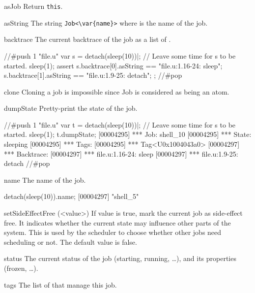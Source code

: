 \begin{urbiscriptapi}
\item[asJob]
  Return \lstinline|this|.

\item[asString] The string \lstinline|Job<\var{name}>| where  is
  the name of the job.

\item[backtrace] The current backtrace of the job as a list of
  .

\begin{urbiscript}
//#push 1 "file.u"
var s = detach(sleep(10))|;
// Leave some time for s to be started.
sleep(1);
assert
{
  s.backtrace[0].asString == "file.u:1.16-24: sleep";
  s.backtrace[1].asString == "file.u:1.9-25: detach";
};
//#pop
\end{urbiscript}

\item[clone]
  Cloning a job is impossible since Job is considered as being an atom.

\item[dumpState]
  Pretty-print the state of the job.

\begin{urbiscript}
//#push 1 "file.u"
var t = detach(sleep(10))|;
// Leave some time for s to be started.
sleep(1);
t.dumpState;
[00004295] *** Job: shell_10
[00004295] ***   State: sleeping
[00004295] ***   Tags:
[00004295] ***     Tag<U0x1004043a0>
[00004297] ***   Backtrace:
[00004297] ***     file.u:1.16-24: sleep
[00004297] ***     file.u:1.9-25: detach
//#pop
\end{urbiscript}

\item[name]  The name of the job.
\begin{urbiscript}
detach(sleep(10)).name;
[00004297] "shell_5"
\end{urbiscript}

\item[setSideEffectFree](<value>)
  If value is true, mark the current job as side-effect free. It indicates
  whether the current state may influence other parts of the system. This is
  used by the scheduler to choose whether other jobs need scheduling or not.
  The default value is false.

\item[status]
  The current status of the job (starting, running, \ldots), and its
  properties (frozen, \ldots).

\item[tags] The list of  that manage this job.


\end{urbiscriptapi}

